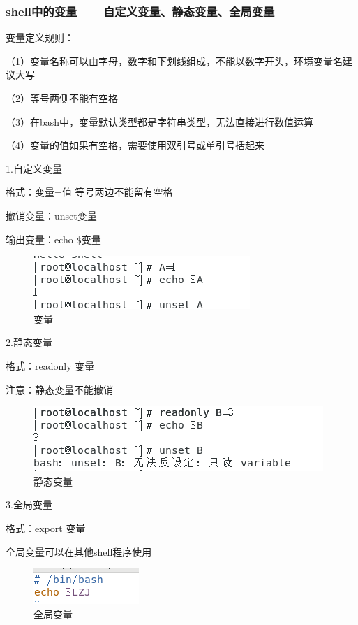 \documentclass{ctexart}
\begin{document}
	\subsubsection{shell中的变量——自定义变量、静态变量、全局变量}
	变量定义规则：
	
	（1）变量名称可以由字母，数字和下划线组成，不能以数字开头，环境变量名建议大写
	
	（2）等号两侧不能有空格
	
	（3）在bash中，变量默认类型都是字符串类型，无法直接进行数值运算
	
	（4）变量的值如果有空格，需要使用双引号或单引号括起来
	
	
	
	1.自定义变量
	
	格式：变量=值 等号两边不能留有空格
	
	撤销变量：unset变量
	
	输出变量：echo \verb|$|变量
	
	\begin{figure}[H]
		\centering
		\includegraphics{2.3}
		\caption{变量}
	\end{figure}
	
	2.静态变量
	
	格式：readonly 变量
	
	注意：静态变量不能撤销
	
	\begin{figure}[H]
		\centering
		\includegraphics{2.4}
		\caption{静态变量}
	\end{figure}
	
	3.全局变量
	
	格式：export 变量
	
	全局变量可以在其他shell程序使用
	
	\begin{figure}[H]
		\centering
		\includegraphics{2.6}
		\caption{全局变量}
	\end{figure}
	
\end{document}
